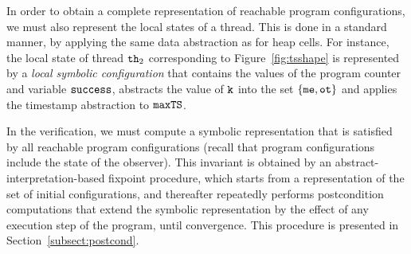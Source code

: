 In order to obtain a complete representation of reachable program configurations,
we must also represent the local states of a thread. This is done in a standard
manner, by applying the same data abstraction as for heap cells. For instance,
the local state of thread ${\tt th}_2$ corresponding to
Figure~\ref{fig:tsshape} is represented by a {\em local symbolic configuration}
that contains the values of the program counter and variable $\tt success$,
abstracts the value of ${\tt k}$ into the set $\left\{{\tt me},{\tt ot}\right\}$ and
applies the timestamp abstraction to ${\tt maxTS}$.




In the  verification, we must compute a symbolic representation
that is satisfied by all reachable program configurations (recall that
program configurations include the state of the observer).
This invariant is obtained by an abstract-interpretation-based
fixpoint procedure, which starts
from a representation of the set of initial configurations, and
thereafter repeatedly performs
postcondition computations that extend the
symbolic representation by the effect of any execution step of the program,
until convergence.
This procedure is presented in Section~\ref{subsect:postcond}.





